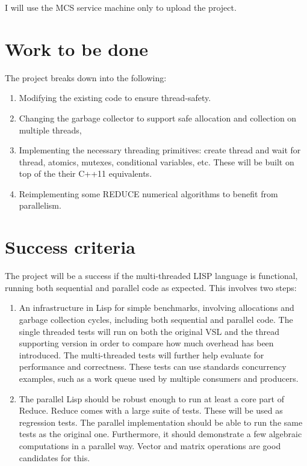 \documentclass[12pt,a4paper,twoside]{article}
\begin{document}
	I will use the MCS service machine only to upload the project.
	
	\section*{Work to be done}
	
	The project breaks down into the following:
	
	\begin{enumerate}
		
		\item Modifying the existing code to ensure thread-safety.
		
		\item Changing the garbage collector to support safe allocation and
		collection on multiple threads,
		
		\item Implementing the necessary threading primitives: create thread and
		wait for thread, atomics, mutexes, conditional variables, etc.  These will be built on top
		of the their C++11 equivalents.
		
		\item Reimplementing some REDUCE numerical algorithms to benefit from parallelism.
		
	\end{enumerate}
	
	\section*{Success criteria}
	
	The project will be a success if the multi-threaded LISP language is functional,
	running both sequential and parallel code as expected. This involves two steps:
	
	\begin{enumerate}
		\item An infrastructure in Lisp for simple benchmarks, involving allocations and
		garbage collection cycles, including both sequential and parallel code. The single 
		threaded tests will run on both the original VSL and the thread supporting version in
		order to compare how much overhead has been introduced. The multi-threaded tests 
		will further help evaluate for performance and correctness. These tests can use
		standards concurrency examples, such as a work queue used by multiple
		consumers and producers.
		
		\item The parallel Lisp should be robust enough to run at least a core part of Reduce.
		Reduce comes with a large suite of tests. These will be used as regression tests. 
		The parallel implementation should be able to run the same tests as the original one. 
		Furthermore, it should demonstrate a few algebraic computations in a parallel way. 
		Vector and matrix operations are good candidates for this.
	\end{enumerate}
	
\end{document}
